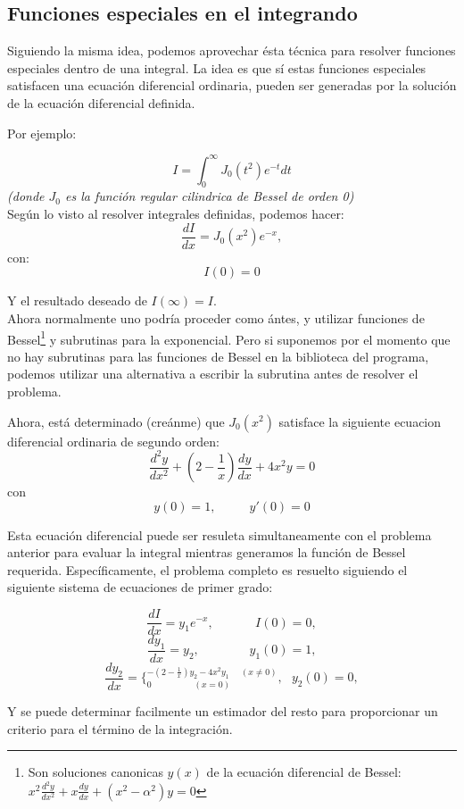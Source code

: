 \subsection{Funciones especiales en el integrando}

Siguiendo la misma idea, podemos aprovechar ésta técnica para resolver
funciones especiales dentro de una integral. La idea es que sí estas funciones
especiales satisfacen una ecuación diferencial ordinaria, pueden ser
generadas por la solución de la ecuación diferencial definida.

Por ejemplo:

$$
	I	=	\int_0^\infty J_0 (t^2) e^{-t} dt
$$
\textit{(donde $J_0$ es la función regular cilindrica de Bessel de orden 0)}\\

Según lo visto al resolver integrales definidas, podemos hacer:
$$
	\frac{dI}{dx}	=	J_0 (x^2) e^{-x},
$$
con:
$$
	I(0) = 0
$$

Y el resultado deseado de $I(\infty) = I$.\\

Ahora normalmente uno podría proceder como ántes, y utilizar funciones de
Bessel\footnote{Son soluciones canonicas $y(x)$ de la ecuación diferencial de
Bessel: $x^2 \frac{d^2 y}{dx^2} + x \frac{dy}{dx} + (x^2 - \alpha^2)y = 0$}
 y subrutinas para la exponencial. Pero si suponemos por el momento que
no hay subrutinas para las funciones de Bessel en la biblioteca del programa,
podemos utilizar una alternativa a escribir la subrutina antes de resolver el
problema.

Ahora, está determinado (creánme) que $J_0(x^2)$ satisface la siguiente
ecuacion diferencial ordinaria de segundo orden:
$$
	\frac{d^2y}{dx^2} + (2 - \frac{1}{x}) \frac{dy}{dx} + 4x^2y = 0
$$
con 
$$
	y(0) = 1, \ \ \ \ \ \ \ \ \ \ \ \  y'(0) = 0
$$

Esta ecuación diferencial puede ser resuleta simultaneamente con el problema
anterior para evaluar la integral mientras generamos la función de Bessel
requerida. Específicamente, el problema completo es resuelto siguiendo el
siguiente sistema de ecuaciones de primer grado:

$$
	\frac{dI}{dx} = y_1 e^{-x}, \ \ \ \ \ \ \ \ \ \ \ \ \ \ \ I(0) = 0,
$$
$$
	\frac{dy_1}{dx} = y_2 ,\ \ \ \ \ \ \ \ \ \ \ \ \ \ \ \ \ \ y_1(0) = 1,
$$
$$
	\frac{dy_2}{dx} = \{^{-(2-\frac{1}{x})y_2-4x^2y_1 \ \ \ \ \ \ (x \neq
0)}_{0 \ \ \ \ \ \ \ \ \ \ \ \ \ \ \ \ \ \ \ \ \ \ (x = 0)}, \ \ \ y_2(0) = 0,
$$

Y se puede determinar facilmente un estimador del resto para proporcionar un
criterio para el término de la integración.

